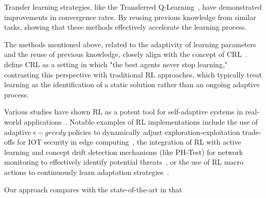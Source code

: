 Transfer learning strategies, like the Transferred Q-Learning~\cite{chen2022transferredqlearning}, 
have demonstrated improvements in convergence rates. By reusing previous knowledge from similar 
tasks, showing that these methods effectively accelerate the learning process.

The methods mentioned above, related to the adaptivity of learning parameters and the reuse of 
previous knowledge, closely align with the concept of 
\ac{CRL}~\cite{khetarpal2022continualreinforcementlearningreview}. 
\citet{abel2023definitioncontinualreinforcementlearning} define \ac{CRL} as a setting in which "the 
best agents never stop learning," contrasting this perspective with traditional \ac{RL} approaches, 
which typically treat learning as the identification of a static solution rather than an ongoing adaptive 
process.

Various studies have shown \ac{RL} as a potent tool for self-adaptive systems in real-world 
applications~\cite{HENRICHS2022106940}. Notable examples of \ac{RL} implementations 
include the use of adaptive $\epsilon-greedy$ policies to dynamically adjust exploration-exploitation 
trade-offs for \ac{IOT} security in edge computing~\cite{iotdynamicrl}, the integration of \ac{RL} 
with active learning and concept drift detection mechanisms (like PH-Test) for network monitoring to 
effectively identify potential threats~\cite{networkdynamicrl}, or the use of \ac{RL} macro actions to 
continuously learn adaptation strategies~\cite{cardozo23}.

Our approach compares with the state-of-the-art in that 


\endinput
